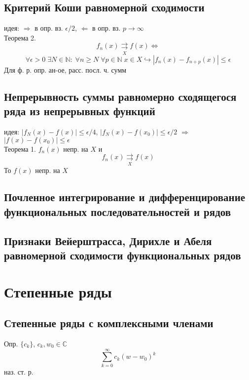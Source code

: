 \documentclass{article}
\begin{document}
\subsection{Критерий Коши равномерной сходимости}
идея: $\Rightarrow$ в опр. вз. $\epsilon/2$, $\Leftarrow$ в опр. вз. $p \rightarrow \infty$ \\
Теорема 2.
\begin{equation*}
    f_n (x) \underset{X}{\rightrightarrows} f(x) \Leftrightarrow
\end{equation*}
\begin{equation*}
    \forall \epsilon>0 \; \exists N \in \mathbb N: \; \forall n \geq N \; \forall p \in \mathbb N \; x \in X \hookrightarrow |f_n (x)-f_{n+p}(x)| \leq \epsilon
\end{equation*}
Для ф. р. опр. ан-ое, расс. посл. ч. сумм
\subsection{Непрерывность суммы равномерно сходящегося ряда из непрерывных функций}
идея: $|f_N(x) - f(x)| \leq \epsilon/4$, $|f_N(x)-f(x_0)| \leq \epsilon/2$ $\Rightarrow$ $|f(x)-f(x_0)| \leq \epsilon$ \\
Теорема 1. $f_n(x)$ непр. на $X$ и
\begin{equation*}
    f_n (x) \underset{X}{\rightrightarrows} f(x)
\end{equation*}
То $f(x)$ непр. на $X$
\subsection{Почленное интегрирование и дифференцирование функциональных последовательностей и рядов}
\subsection{Признаки Вейерштрасса, Дирихле и Абеля равномерной сходимости функциональных рядов}


\section{Степенные ряды}
\subsection{Степенные ряды с комплексными членами}
Опр. $\{ c_k \}$, $c_k, w_0 \in \mathbb C$
\begin{equation*}
    \sum_{k=0}^\infty c_k (w-w_0)^k
\end{equation*}
наз. ст. р.
\end{document}
